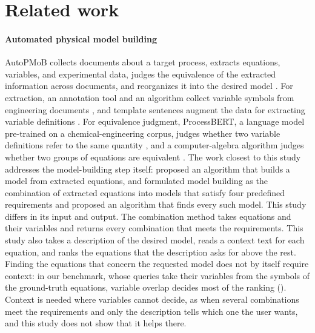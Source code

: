 \section{Related work}\label{sec:related}

\paragraph{Automated physical model building} AutoPMoB collects documents about a target process,
extracts equations, variables, and experimental data, judges the equivalence of the extracted
information across documents, and reorganizes it into the desired model
\citep{AutoPMoBCSTR,AutoPMoBProto}. For extraction, an annotation tool and an algorithm collect
variable symbols from engineering documents \citep{VARAT}, and template sentences augment the data
for extracting variable definitions \citep{Nagayama}. For equivalence judgment, ProcessBERT, a
language model pre-trained on a chemical-engineering corpus, judges whether two variable
definitions refer to the same quantity \citep{ProcessBERT}, and a computer-algebra algorithm judges
whether two groups of equations are equivalent \citep{DAEEquiv,ZhangEquiv}. The work closest to
this study addresses the model-building step itself: \citet{KatoESCAPE} proposed an algorithm that
builds a model from extracted equations, and \citet{CombineEq} formulated model building as the
combination of extracted equations into models that satisfy four predefined requirements and
proposed an algorithm that finds every such model. This study differs in its input and output. The
combination method takes equations and their variables and returns every combination that meets the
requirements. This study also takes a description of the desired model, reads a context text for
each equation, and ranks the equations that the description asks for above the rest. Finding the
equations that concern the requested model does not by itself require context: in our benchmark,
whose queries take their variables from the symbols of the ground-truth equations, variable overlap
decides most of the ranking (). Context is needed where variables cannot
decide, as when several combinations meet the requirements and only the description tells which one
the user wants, and this study does not show that it helps there.

